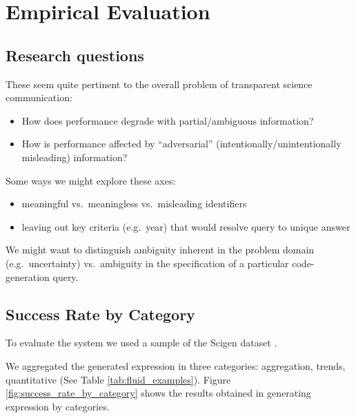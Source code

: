 \section{Empirical Evaluation}
\label{sec:evaluation}

\subsection{Research questions}

These seem quite pertinent to the overall problem of transparent science communication:
\begin{itemize}
\item How does performance degrade with partial/ambiguous information?
\item How is performance affected by ``adversarial'' (intentionally/unintentionally misleading) information?
\end{itemize}

Some ways we might explore these axes:
\begin{itemize}
\item meaningful vs.~meaningless vs.~misleading identifiers
\item leaving out key criteria (e.g.~year) that would resolve query to unique answer
\end{itemize}

We might want to distinguish ambiguity inherent in the problem domain (e.g.~uncertainty) vs.~ambiguity in the
specification of a particular code-generation query.

\subsection{Success Rate by Category}
To evaluate the system we used a sample of the Scigen dataset \cite{scigen_dataset_2021}.

We aggregated the generated expression in three categories: aggregation, trends, quantitative (See Table \ref{tab:fluid_examples}).
Figure \ref{fig:success_rate_by_category} shows the results obtained in generating expression by categories.


